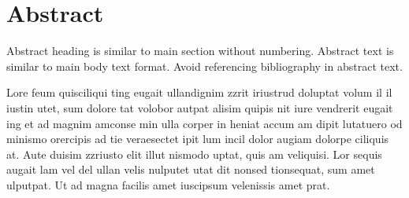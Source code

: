 
\chapter{Abstract} \label{chp:abstract}

Abstract heading is similar to main section without numbering. Abstract text is similar to main body text format. Avoid referencing bibliography in abstract text.

Lore feum quisciliqui ting eugait ullandignim zzrit iriustrud doluptat volum il il iustin utet, sum dolore tat volobor autpat alisim quipis nit iure vendrerit eugait ing et ad magnim amconse min ulla corper in heniat accum am dipit lutatuero od minismo orercipis ad tie veraesectet ipit lum incil dolor augiam dolorpe ciliquis at. Aute duisim zzriusto elit illut nismodo uptat, quis am veliquisi. Lor sequis augait lam vel del ullan velis nulputet utat dit nonsed tionsequat, sum amet ulputpat. Ut ad magna facilis amet iuscipsum velenissis amet prat.
